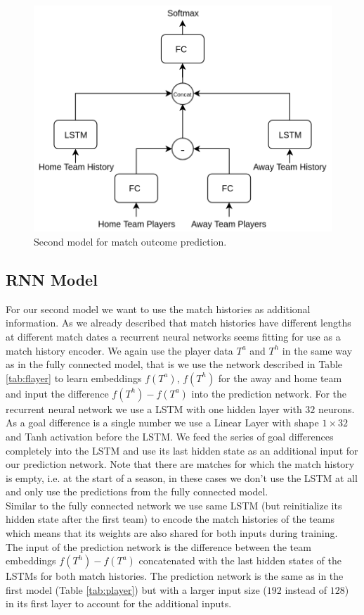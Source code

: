\documentclass[a4paper]{article}
\begin{document}
\begin{figure} 
\includegraphics[scale=0.28]{img/Siamese2.png}
\caption{Second model for match outcome prediction.}
\label{fig:rnn}
\end{figure}


\subsection{RNN Model}
For our second model we want to use the match histories as additional information. As we already described that match histories have different lengths at different match dates a recurrent neural networks seems fitting for use as a match history encoder. We again use the player data $T^a$ and $T^h$ in the same way as in the fully connected model, that is we use the network described in Table \ref{tab:flayer} to learn embeddings $f(T^a)$, $f(T^h)$ for the away and home team and input the difference $f(T^h) - f(T^a)$ into the prediction network. For the recurrent neural network we use a LSTM \cite{LSTM97} with one hidden layer with $32$ neurons. As a goal difference is a single number we use a Linear Layer with shape $1 \times 32$ and Tanh activation before the LSTM. We feed the series of goal differences completely into the LSTM and use its last hidden state as an additional input for our prediction network. Note that there are matches for which the match history is empty, i.e. at the start of a season, in these cases we don't use the LSTM at all and only use the predictions from the fully connected model.\\
Similar to the fully connected network we use same LSTM (but reinitialize its hidden state after the first team) to encode the match histories of the teams which means that its weights are also shared for both inputs during training. \\
The input of the prediction network is the difference between the team embeddings $f(T^h) - f(T^a)$ concatenated with the last hidden states of the LSTMs for both match histories. The prediction network is the same as in the first model (Table \ref{tab:player}) but with a larger input size ($192$ instead of $128$) in its first layer to account for the additional inputs. 
\end{document}
